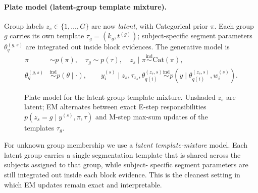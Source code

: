 \paragraph{Plate model (latent-group template mixture).}
Group labels $z_s\in\{1,\dots,G\}$ are now \emph{latent}, with Categorical prior $\pi$. Each
group $g$ carries its own template $\tau_g=(k_g,t^{(g)})$; subject-specific segment parameters
$\theta^{(g,s)}_q$ are integrated out inside block evidences. The generative model is
\begin{equation}
\begin{aligned}
\pi&\sim p(\pi),\quad \tau_g\sim p(\tau),\quad z_s\mid\pi\stackrel{\mathrm{ind}}{\sim}\mathrm{Cat}(\pi),\\
\theta^{(g,s)}_q&\stackrel{\mathrm{ind}}{\sim}p(\theta\mid\cdot),\qquad
y^{(s)}_i\mid z_s,\tau_{z_s},\theta^{(z_s,s)}_{q(i)}\stackrel{\mathrm{ind}}{\sim}p(y\mid\theta^{(z_s,s)}_{q(i)},w^{(s)}_i).
\end{aligned}
\label{eq:plate-latent-em}
\end{equation}
\begin{figure}[H]
\centering
{}
\caption[Latent-group template-mixture plate model]{Plate model for the latent-group template mixture. Unshaded $z_s$ are latent; EM alternates between exact E-step responsibilities $p(z_s=g\mid y^{(s)},\pi,\tau)$ and M-step max-sum updates of the templates $\tau_g$.}
\label{fig:plate-latent-em}
\end{figure}

For unknown group membership we use a \emph{latent template-mixture} model. Each latent group carries a
single segmentation template that is shared across the subjects assigned to that group, while subject-
specific segment parameters are still integrated out inside each block evidence. This is the cleanest
setting in which EM updates remain exact and interpretable.

